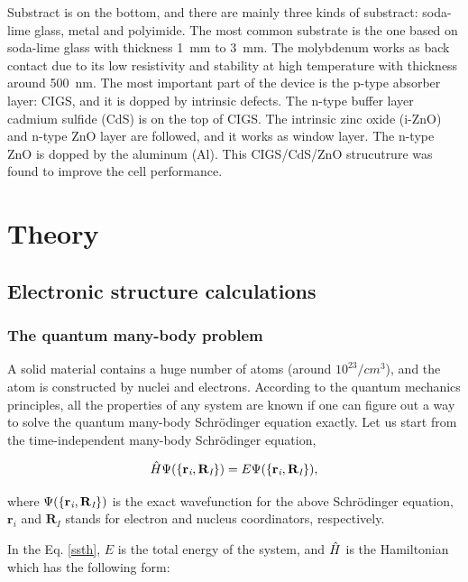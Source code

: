 \documentclass[a4paper, 12pt, titlepage,oneside,drop]{kthesis}
\begin{document}
Substract is on the bottom, and there are mainly three kinds of substract: soda-lime glass, metal and polyimide. The most common substrate is the one based on soda-lime glass with thickness \SI{1} {\mm} to \SI{3} {\mm}. The molybdenum works as back contact due to its low resistivity and stability at high 
temperature with thickness around \SI{500} {\nm}. The most important part of the device is the p-type absorber layer: CIGS, and it is dopped by intrinsic defects. The n-type buffer layer cadmium sulfide (CdS) is on the top of CIGS.
The intrinsic zinc oxide (i-ZnO) and n-type ZnO layer are followed, and it works as window layer. The n-type ZnO is dopped by the aluminum (Al). This CIGS/CdS/ZnO strucutrure was found to improve the cell performance.







\chapter{Theory}

\section{Electronic structure calculations }
\label{ch:dft}

\subsection{The quantum many-body problem}
\label{ch:mb}

\noindent A solid material contains a huge number of atoms (around $10^{23}/cm^3$), and the atom is constructed by nuclei and electrons. 
According to the quantum mechanics principles, all the properties of any system are known if one can figure out a way to solve 
the quantum many-body Schrödinger equation exactly. Let us start from the time-independent many-body Schrödinger equation,

\begin{equation}\label{ssth}
 {\hat{H}} {\Psi(\{ {\textbf r}_{\textit i}, {\textbf R}_{\textit I} \})} = {E} {\Psi(\{ {\textbf r}_{\textit i}, {\textbf R}_{\textit I} \})},
\end{equation}

where $\Psi(\{ {\textbf r}_{\textit i}, {\textbf R}_{\textit I} \})$  is the exact wavefunction for the above Schrödinger equation, $\textbf{r}_\textit{i}$ and $\textbf{R}_\textit{I}$  stands for electron and
nucleus coordinators, respectively.

In the Eq. \ref{ssth}, $E$ is the total energy of the system, and $\hat{H}$ is the Hamiltonian which has the following form:
\end{document}
